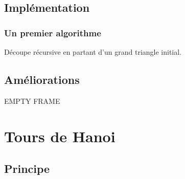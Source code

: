\documentclass{beamer}%
\begin{document}
		\subsection{Implémentation}
			\begin{frame}
				\frametitle{Un premier algorithme}
                                Découpe récursive en partant d'un
                                grand triangle initial.
                                \begin{figure}
                                        \centering
                                \end{figure}
			\end{frame}
			
		\subsection{Améliorations}
			\begin{frame}
				EMPTY FRAME
			\end{frame}
			
	\section{Tours de Hanoi}
		\subsection{Principe}
		
\end{document}
